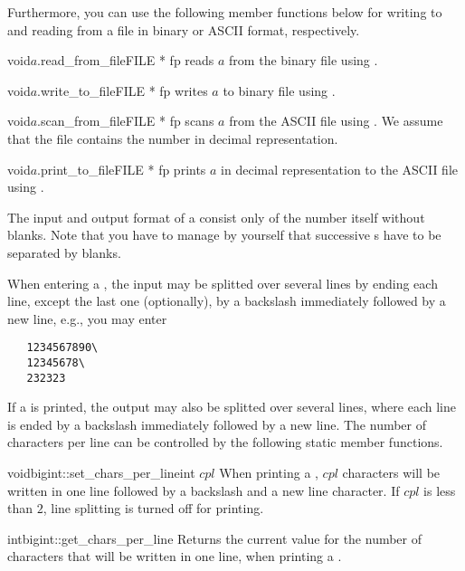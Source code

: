Furthermore, you can use the following member functions below for writing to and reading from a
file in binary or ASCII format, respectively.

\begin{fcode}{void}{$a$.read_from_file}{FILE * fp}
  reads $a$ from the binary file  using .
\end{fcode}

\begin{fcode}{void}{$a$.write_to_file}{FILE * fp}
  writes $a$ to binary file  using .
\end{fcode}

\begin{fcode}{void}{$a$.scan_from_file}{FILE * fp}
  scans $a$ from the ASCII file  using .  We assume that the file contains
  the number in decimal representation.
\end{fcode}

\begin{fcode}{void}{$a$.print_to_file}{FILE * fp}
  prints $a$ in decimal representation to the ASCII file  using .
\end{fcode}

The input and output format of a  consist only of the number itself without
blanks.  Note that you have to manage by yourself that successive s have to be
separated by blanks.

When entering a , the input may be splitted over several lines by ending each
line, except the last one (optionally), by a backslash immediately followed by a new line, e.g.,
you may enter
\begin{verbatim}
   1234567890\
   12345678\
   232323
\end{verbatim}
If a  is printed, the output may also be splitted over several lines, where each
line is ended by a backslash immediately followed by a new line.  The number of characters per
line can be controlled by the following static member functions.

\begin{fcode}{void}{bigint::set_chars_per_line}{int $\mathit{cpl}$}
  When printing a , $\mathit{cpl}$ characters will be written in one line followed
  by a backslash and a new line character.  If $\mathit{cpl}$ is less than $2$, line splitting
  is turned off for printing.
\end{fcode}

\begin{fcode}{int}{bigint::get_chars_per_line}{}
  Returns the current value for the number of characters that will be written in one line, when
  printing a \code{bigint}.
\end{fcode}

